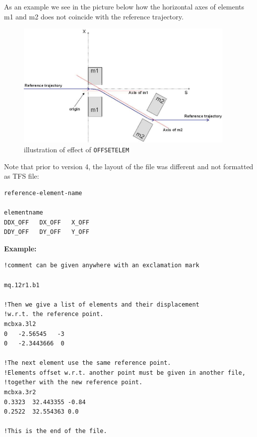 
As an example we see in the picture below how the horizontal axes of elements m1 and m2 
does not coincide with the reference trajectory.
\begin{figure}[htb]
  \begin{center}
    \includegraphics[width=400px]{jpg/offsetelem.jpg}
    \caption{illustration of effect of {\tt OFFSETELEM}}
    \label{fig:offsetelem}
  \end{center}
\end{figure}

Note that prior to \madx version 4, the layout of the file was different
and not formatted as TFS file: 

\begin{verbatim}
reference-element-name

elementname
DDX_OFF   DX_OFF   X_OFF
DDY_OFF   DY_OFF   Y_OFF
\end{verbatim} 

{\bf Example:} 
\begin{verbatim}
!comment can be given anywhere with an exclamation mark

mq.12r1.b1

!Then we give a list of elements and their displacement 
!w.r.t. the reference point.
mcbxa.3l2
0   -2.56545   -3
0   -2.3443666  0

!The next element use the same reference point.
!Elements offset w.r.t. another point must be given in another file,
!together with the new reference point.
mcbxa.3r2
0.3323  32.443355 -0.84
0.2522  32.554363 0.0

!This is the end of the file.
\end{verbatim}


